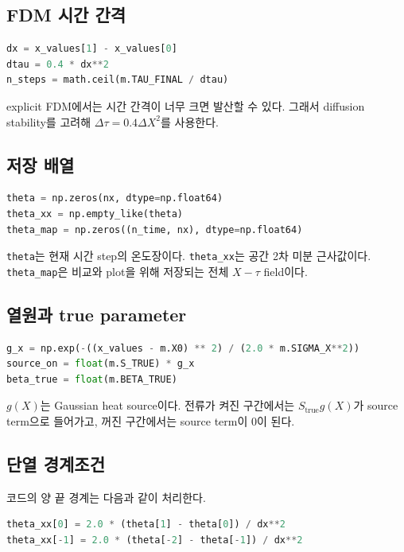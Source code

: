\documentclass[11pt]{article}
\begin{document}
\subsection*{FDM 시간 간격}

\begin{lstlisting}[language=Python]
dx = x_values[1] - x_values[0]
dtau = 0.4 * dx**2
n_steps = math.ceil(m.TAU_FINAL / dtau)
\end{lstlisting}

explicit FDM에서는 시간 간격이 너무 크면 발산할 수 있다.
그래서 diffusion stability를 고려해 \(\Delta \tau = 0.4 \Delta X^2\)를 사용한다.

\subsection*{저장 배열}

\begin{lstlisting}[language=Python]
theta = np.zeros(nx, dtype=np.float64)
theta_xx = np.empty_like(theta)
theta_map = np.zeros((n_time, nx), dtype=np.float64)
\end{lstlisting}

\texttt{theta}는 현재 시간 step의 온도장이다.
\texttt{theta\_xx}는 공간 2차 미분 근사값이다.
\texttt{theta\_map}은 비교와 plot을 위해 저장되는 전체 \(X-\tau\) field이다.

\subsection*{열원과 true parameter}

\begin{lstlisting}[language=Python]
g_x = np.exp(-((x_values - m.X0) ** 2) / (2.0 * m.SIGMA_X**2))
source_on = float(m.S_TRUE) * g_x
beta_true = float(m.BETA_TRUE)
\end{lstlisting}

\(g(X)\)는 Gaussian heat source이다.
전류가 켜진 구간에서는 \(S_{\mathrm{true}}g(X)\)가 source term으로 들어가고, 꺼진 구간에서는 source term이 0이 된다.

\subsection*{단열 경계조건}

코드의 양 끝 경계는 다음과 같이 처리한다.

\begin{lstlisting}[language=Python]
theta_xx[0] = 2.0 * (theta[1] - theta[0]) / dx**2
theta_xx[-1] = 2.0 * (theta[-2] - theta[-1]) / dx**2
\end{lstlisting}
\end{document}
